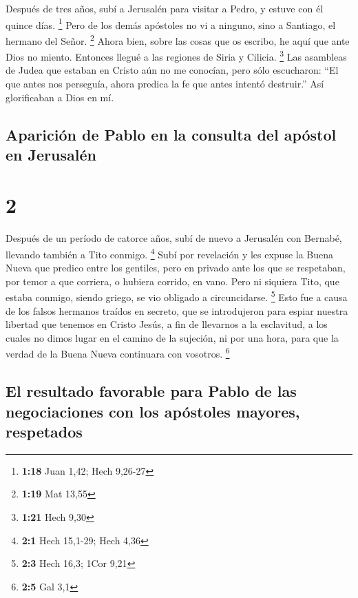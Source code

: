  Después de tres años, subí a Jerusalén para visitar a
Pedro, y estuve con él quince días. \footnote{\textbf{1:18} Juan 1,42;
  Hech 9,26-27}  Pero de los demás apóstoles no vi a
ninguno, sino a Santiago, el hermano del Señor. \footnote{\textbf{1:19}
  Mat 13,55}  Ahora bien, sobre las cosas que os escribo,
he aquí que ante Dios no miento.  Entonces llegué a las
regiones de Siria y Cilicia. \footnote{\textbf{1:21} Hech 9,30}
 Las asambleas de Judea que estaban en Cristo aún no me
conocían,  pero sólo escucharon: ``El que antes nos
perseguía, ahora predica la fe que antes intentó destruir.''
 Así glorificaban a Dios en mí.

\hypertarget{apariciuxf3n-de-pablo-en-la-consulta-del-apuxf3stol-en-jerusaluxe9n}{%
\subsection{Aparición de Pablo en la consulta del apóstol en
Jerusalén}\label{apariciuxf3n-de-pablo-en-la-consulta-del-apuxf3stol-en-jerusaluxe9n}}

\hypertarget{section-1}{%
\section{2}\label{section-1}}

 Después de un período de catorce años, subí de nuevo a
Jerusalén con Bernabé, llevando también a Tito conmigo. \footnote{\textbf{2:1}
  Hech 15,1-29; Hech 4,36}  Subí por revelación y les
expuse la Buena Nueva que predico entre los gentiles, pero en privado
ante los que se respetaban, por temor a que corriera, o hubiera corrido,
en vano.  Pero ni siquiera Tito, que estaba conmigo,
siendo griego, se vio obligado a circuncidarse. \footnote{\textbf{2:3}
  Hech 16,3; 1Cor 9,21}  Esto fue a causa de los falsos
hermanos traídos en secreto, que se introdujeron para espiar nuestra
libertad que tenemos en Cristo Jesús, a fin de llevarnos a la
esclavitud,  a los cuales no dimos lugar en el camino de
la sujeción, ni por una hora, para que la verdad de la Buena Nueva
continuara con vosotros. \footnote{\textbf{2:5} Gal 3,1}

\hypertarget{el-resultado-favorable-para-pablo-de-las-negociaciones-con-los-apuxf3stoles-mayores-respetados}{%
\subsection{El resultado favorable para Pablo de las negociaciones con
los apóstoles mayores,
respetados}\label{el-resultado-favorable-para-pablo-de-las-negociaciones-con-los-apuxf3stoles-mayores-respetados}}

